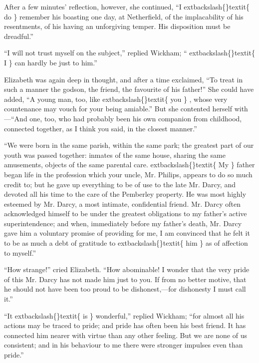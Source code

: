 \documentclass[10pt]{book}
\begin{document}
   After a few minutes’ reflection, however, she continued, “I
   	extbackslash\{\}textit\{
    do
   \}
   remember his boasting one day, at Netherfield, of the implacability of
his resentments, of his having an unforgiving temper. His disposition
must be dreadful.”
  

   “I will not trust myself on the subject,” replied Wickham; “
   	extbackslash\{\}textit\{
    I
   \}
   can
hardly be just to him.”
  

   Elizabeth was again deep in thought, and after a time exclaimed, “To
treat in such a manner the godson, the friend, the favourite of his
father!” She could have added, “A young man, too, like
   	extbackslash\{\}textit\{
    you
   \}
   , whose very
countenance may vouch for your being amiable.” But she contented herself
with—“And one, too, who had probably been his own companion from
childhood, connected together, as I think you said, in the closest
manner.”
  

   “We were born in the same parish, within the same park; the greatest
part of our youth was passed together: inmates of the same house,
sharing the same amusements, objects of the same parental care.
   	extbackslash\{\}textit\{
    My
   \}
   father began life in the profession which your uncle, Mr. Philips,
appears to do so much credit to; but he gave up everything to be of use
to the late Mr. Darcy, and devoted all his time to the care of the
Pemberley property. He was most highly esteemed by Mr. Darcy, a most
intimate, confidential friend. Mr. Darcy often acknowledged himself to
be under the greatest obligations to my father’s active superintendence;
and when, immediately before my father’s death, Mr. Darcy gave him a
voluntary promise
   of providing for me, I am convinced that he felt it
to be as much a debt of gratitude to
   	extbackslash\{\}textit\{
    him
   \}
   as of affection to myself.”
  

   “How strange!” cried Elizabeth. “How abominable! I wonder that the very
pride of this Mr. Darcy has not made him just to you. If from no better
motive, that he should not have been too proud to be dishonest,—for
dishonesty I must call it.”
  

   “It
   	extbackslash\{\}textit\{
    is
   \}
   wonderful,” replied Wickham; “for almost all his actions may be
traced to pride; and pride has often been his best friend. It has
connected him nearer with virtue than any other feeling. But we are none
of us consistent; and in his behaviour to me there were stronger
impulses even than pride.”
  
\end{document}
